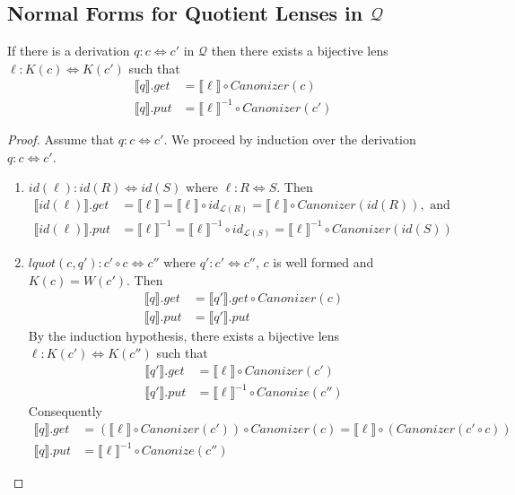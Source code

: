 \documentclass{svproc}
\begin{document}
\subsection{Normal Forms for Quotient Lenses in $\mathcal{Q}$}
\begin{theorem}\label{normal form}
If there is a derivation $q : c \Leftrightarrow c'$ in
$\mathcal{Q}$ then there exists a bijective lens $\ell : K(c) \Leftrightarrow
K(c')$ such that
\begin{align*}
\llbracket q \rrbracket.get &= \llbracket \ell \rrbracket\circ Canonizer(c)\\
\llbracket q \rrbracket.put &= \llbracket \ell \rrbracket^{-1} \circ
Canonizer(c')
\end{align*}
\end{theorem}
\begin{proof}
Assume that $q : c \Leftrightarrow c'$. We proceed by induction over the
derivation $q : c \Leftrightarrow c'$.
\begin{enumerate}
  \item
  $id(\ell): id(R) \Leftrightarrow id(S)$ where $\ell : R \Leftrightarrow
S$. Then
  \begin{align*}
  \llbracket id(\ell) \rrbracket.get &=  \llbracket \ell \rrbracket = \llbracket \ell \rrbracket \circ
  id_{\mathcal{L}(R)} = \llbracket \ell \rrbracket \circ Canonizer(id(R)), \text{ and }\\
  \llbracket id(\ell) \rrbracket.put &= \llbracket \ell \rrbracket^{-1} = \llbracket \ell \rrbracket^{-1} \circ
  id_{\mathcal{L}(S)} = \llbracket \ell \rrbracket^{-1} \circ Canonizer(id(S))
  \end{align*}
  \item
  $lquot(c, q'): c' \circ c \Leftrightarrow c''$ where $q' : c' 
  \Leftrightarrow c''$, $c$ is well formed and $K(c) = W(c')$. Then
\begin{align*}
  \llbracket q \rrbracket.get  &= \llbracket q'
  \rrbracket.get \circ Canonizer(c)\\
  \llbracket q \rrbracket.put &= \llbracket q' \rrbracket.put
  \end{align*}
  By the induction hypothesis, there exists a bijective lens $\ell :
  K(c') \Leftrightarrow K(c'')$ such that 
  \begin{align*}
\llbracket q' \rrbracket.get &= \llbracket \ell \rrbracket \circ Canonizer(c')\\
\llbracket q' \rrbracket.put &= \llbracket \ell \rrbracket^{-1} \circ
Canonize(c'')
\end{align*}
Consequently
\begin{align*}
  \llbracket q \rrbracket.get  &= (\llbracket \ell \rrbracket \circ
  Canonizer(c')) \circ Canonizer(c) = \llbracket \ell \rrbracket \circ
  (Canonizer(c' \circ c))\\
  \llbracket q \rrbracket.put &= \llbracket \ell \rrbracket^{-1} \circ
  Canonize(c'')
  \end{align*}


\end{enumerate}
\end{proof}
\end{document}
